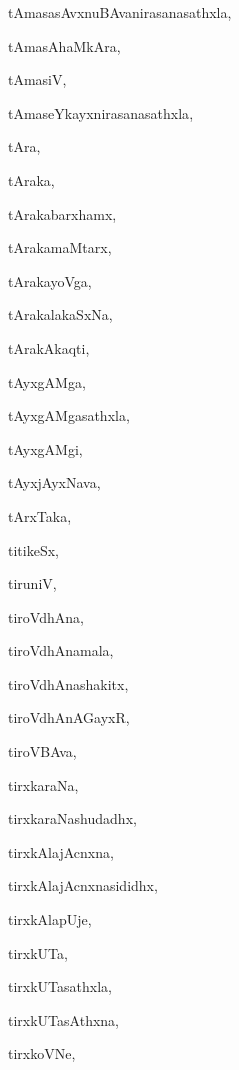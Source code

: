 \begin{multicols}{2}
{tAmasasAvxnuBAvanirasanasathxla}, \pageref{tAmasasAvxnuBAvanirasanasathxla}

{tAmasAhaMkAra}, \pageref{tAmasAhaMkAra}

{tAmasiV}, \pageref{tAmasiV}

{tAmaseYkayxnirasanasathxla}, \pageref{tAmaseYkayxnirasanasathxla}

{tAra}, \pageref{tAra}

{tAraka}, \pageref{tAraka}

{tArakabarxhamx}, \pageref{tArakabarxhamx}

{tArakamaMtarx}, \pageref{tArakamaMtarx}

{tArakayoVga}, \pageref{tArakayoVga}

{tArakalakaSxNa}, \pageref{tArakalakaSxNa}

{tArakAkaqti}, \pageref{tArakAkaqti}

{tAyxgAMga}, \pageref{tAyxgAMga}

{tAyxgAMgasathxla}, \pageref{tAyxgAMgasathxla}

{tAyxgAMgi}, \pageref{tAyxgAMgi}

{tAyxjAyxNava}, \pageref{tAyxjAyxNava}

{tArxTaka}, \pageref{tArxTaka}

{titikeSx}, \pageref{titikeSx}

{tiruniV{\ru}}, \pageref{tiruniVru}

{tiroVdhAna}, \pageref{tiroVdhAna}

{tiroVdhAnamala}, \pageref{tiroVdhAnamala}

{tiroVdhAnashakitx}, \pageref{tiroVdhAnashakitx}

{tiroVdhAnAGayxR}, \pageref{tiroVdhAnAGayxR}

{tiroVBAva}, \pageref{tiroVBAva}

{tirxkaraNa}, \pageref{tirxkaraNa}

{tirxkaraNashudadhx}, \pageref{tirxkaraNashudadhx}

{tirxkAlajAcnxna}, \pageref{tirxkAlajAcnxna}

{tirxkAlajAcnxnasididhx}, \pageref{tirxkAlajAcnxnasididhx}

{tirxkAlapUje}, \pageref{tirxkAlapUje}

{tirxkUTa}, \pageref{tirxkUTa}

{tirxkUTasathxla}, \pageref{tirxkUTasathxla}

{tirxkUTasAthxna}, \pageref{tirxkUTasAthxna}

{tirxkoVNe}, \pageref{tirxkoVNe}


\end{multicols}
